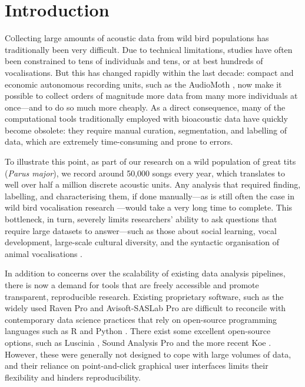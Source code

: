 \section{Introduction}

\lettrine[lines=2]Collecting large amounts of acoustic data from wild bird populations has
traditionally been very difficult. Due to technical limitations, studies have
often been constrained to tens of individuals and tens, or at best hundreds of
vocalisations. But this has changed rapidly within the last decade: compact and
economic autonomous recording units, such as the AudioMoth \parencite{hill2019}, now
make it possible to collect orders of magnitude more data from many more
individuals at once---and to do so much more cheaply. As a direct consequence,
many of the computational tools traditionally employed with bioacoustic data
have quickly become obsolete: they require manual curation, segmentation, and
labelling of data, which are extremely time-consuming and prone to errors.

To illustrate this point, as part of our research on a wild population of great
tits (\textit{Parus major}), we record around 50,000 songs every year, which
translates to well over half a million discrete acoustic units. Any analysis
that required finding, labelling, and characterising them, if done manually---as
is still often the case in wild bird vocalisation research \parencite{beecher2020a,
demko2018, mclean2020, pipek2018, youngblood2022}---would take a very long time to
complete. This bottleneck, in turn, severely limits researchers' ability to ask
questions that require large datasets to answer---such as those about social
learning, vocal development, large-scale cultural diversity, and the syntactic
organisation of animal vocalisations \parencite{aplin2019, kollmorgen2020,
lachlan2018, sainburg2019}.

In addition to concerns over the scalability of existing data analysis
pipelines, there is now a demand for tools that are freely accessible and
promote transparent, reproducible research. Existing proprietary software, such
as the widely used Raven Pro \cite[up to \$800,][]{raven2019} and Avisoft-SASLab
Pro \parencite[up to \$2,835,][]{specht2002} are difficult to reconcile with
contemporary data science practices that rely on open-source programming
languages such as R \parencite{rcoreteam2021} and Python \parencite{vanrossum1995}.
There exist some excellent open-source options, such as Luscinia
\parencite{lachlan2016a}, Sound Analysis Pro \parencite{tchernichovski2000} and the more
recent Koe \parencite{fukuzawa2020}. However, these were generally not designed to
cope with large volumes of data, and their reliance on point-and-click graphical
user interfaces limits their flexibility and hinders reproducibility.

